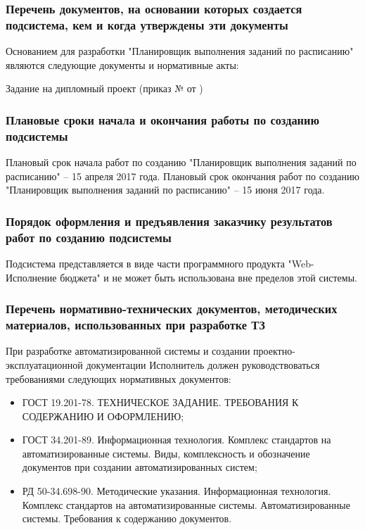 \documentclass[a4paper]{extarticle}
\begin{document}
\subsubsection{Перечень документов, на основании которых создается подсистема, кем и когда утверждены эти документы}
Основанием для разработки "Планировщик выполнения заданий по расписанию" являются следующие документы и нормативные акты:\par
Задание на дипломный проект (приказ №    от    )

\subsubsection{Плановые сроки начала и окончания работы по созданию подсистемы}
Плановый срок начала работ по созданию "Планировщик выполнения заданий по расписанию" – 15 апреля 2017 года. Плановый срок окончания работ по созданию "Планировщик выполнения заданий по расписанию" – 15 июня 2017 года.

\subsubsection{Порядок оформления и предъявления заказчику результатов работ по созданию подсистемы}
Подсистема представляется в виде части программного продукта "Web-Исполнение бюджета" и не может быть использована вне пределов этой системы.

\subsubsection{Перечень нормативно-технических документов, методических материалов, использованных при разработке ТЗ}
При разработке автоматизированной системы и создании проектно-эксплуатационной документации Исполнитель должен руководствоваться требованиями следующих нормативных документов:
\begin{itemize}
  \item ГОСТ 19.201-78. ТЕХНИЧЕСКОЕ ЗАДАНИЕ. ТРЕБОВАНИЯ К СОДЕРЖАНИЮ И ОФОРМЛЕНИЮ;
  \item ГОСТ 34.201-89. Информационная технология. Комплекс стандартов на автоматизированные системы. Виды, комплексность и обозначение документов при создании автоматизированных систем;
  \item РД 50-34.698-90. Методические указания. Информационная технология. Комплекс стандартов на автоматизированные системы. Автоматизированные системы. Требования к содержанию документов.
\end{itemize}
\end{document}
